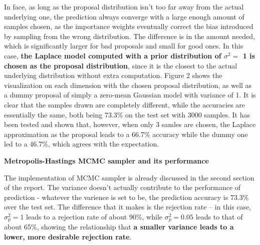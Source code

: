 \documentclass{article} %
\begin{document}
  In face, as long as the proposal distribution isn't too far away from the actual underlying one, the prediction always converge with a large enough amount of samples chosen, as the importance weights eventually correct the bias introduced by sampling from the wrong distribution. The difference is in the amount needed, which is significantly larger for bad proposals and small for good ones. In this case, \textbf{the Laplace model computed with a prior distribution of $\sigma^2 =$ 1 is chosen as the proposal distribution}, since it is the closest to the actual underlying distribution without extra computation. Figure 2 shows the visualization on each dimension with the chosen proposal distribution, as well as a dummy proposal of simply a zero-mean Gaussian model with variance of 1. It is clear that the samples drawn are completely different, while the accuracies are essentially the same, both being 73.3\% on the test set with 3000 samples. It has been tested and shown that, however, when only 3 samles are chosen, the Laplace approximation as the proposal leads to a 66.7\% accuracy while the dummy one led to a 46.7\%, which agrees with the expectation.


\vspace{1cm}
{\large\textbf{Metropolis-Hastings MCMC sampler and its performance}}

  The implementation of MCMC sampler is already discussed in the second section of the report. The variance doesn't actually contribute to the performance of prediction - whatever the varience is set to be, the prediction accuracy is 73.3\% over the test set. The difference that it makes is the rejection rate -- in this case, $\sigma^2_p = 1$ leads to a rejection rate of about 90\%, while $\sigma^2_p = 0.05$ leads to that of about 65\%, showing the relationship that \textbf{a smaller variance leads to a lower, more desirable rejection rate}.
\end{document}
